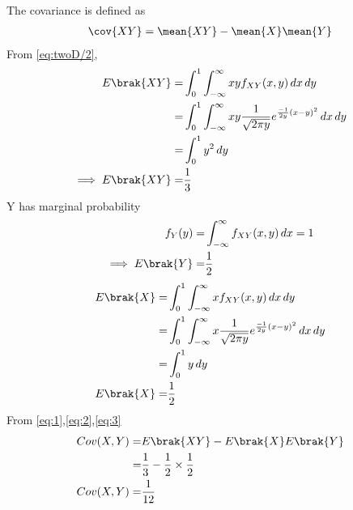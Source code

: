 The covariance is defined as
%
\begin{align}
    \cov{XY} = \mean{XY}-\mean{X}\mean{Y}
\end{align}
From \eqref{eq:twoD/2},
%
\begin{align}
    E\brak{XY}=&\int_{0}^{1}\int_{-\infty}^{\infty}xy f_{XY}(x,y)\,dx\,dy\\
    =&\int_{0}^{1}\int_{-\infty}^{\infty}xy\frac{1}{\sqrt{2\pi y}}e^{\frac{-1}{2y}(x-y)^2}\,dx \,dy\\
    =&\int_{0}^{1}y^2 \,dy\\
     \implies E\brak{XY}=&\frac{1}{3} \label{eq:1}
    \end{align}
Y has marginal probability
\begin{align}
    f_Y(y)=&\int_{-\infty}^{\infty}f_{XY}(x,y)\,dx =1\\
    \implies E\brak{Y}=&\frac{1}{2} \label{eq:2}
\end{align}
\begin{align}
 E\brak{X}=&\int_{0}^{1}\int_{-\infty}^{\infty}x f_{XY}(x,y)\,dx\,dy\\
    =&\int_{0}^{1}\int_{-\infty}^{\infty}x\frac{1}{\sqrt{2\pi y}}e^{\frac{-1}{2y}(x-y)^2}\,dx \,dy\\
    =&\int_{0}^{1}y\,dy\\
E\brak{X}=&\frac{1}{2} \label{eq:3} \\
\end{align}
From \eqref{eq:1},\eqref{eq:2},\eqref{eq:3}
\begin{align}
Cov(X,Y)=&E\brak{XY}-E\brak{X}E\brak{Y}\\
       =&\frac{1}{3}-\frac{1}{2}\times \frac{1}{2}\\
Cov(X,Y)=&\frac{1}{12}
\end{align}
